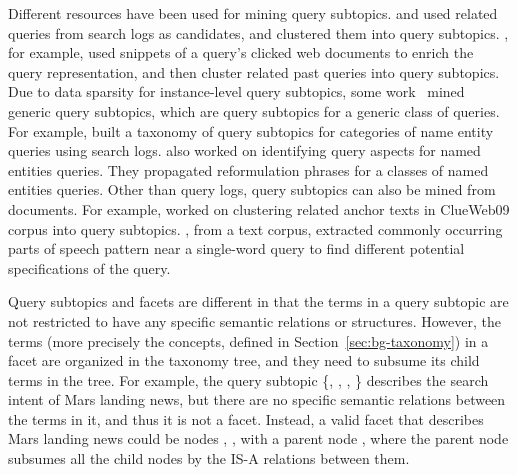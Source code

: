 Different resources have been used for mining query subtopics. \citet{wang2007learn} and \citet{hu2012mining} used related queries from search logs as candidates, and clustered them into query subtopics. \citet{wang2007learn}, for example, used snippets of a query's clicked web documents to enrich the query representation, and then cluster related past queries into query subtopics.
Due to data sparsity for instance-level query subtopics, some work~\cite{wang2009mining,xue2011topic,wu2011identifying,yin2010building} mined generic query subtopics, which are query subtopics for a generic class of queries. For example, \citet{yin2010building} built a taxonomy of query subtopics for categories of name entity queries using search logs. \citet{wu2011identifying} also worked on identifying query aspects for named entities queries. They propagated reformulation phrases for a classes of named entities queries. Other than query logs, query subtopics can also be mined from documents. For example, \citet{dang2011inferring} worked on clustering related anchor texts in ClueWeb09 corpus into query subtopics. \citet{allan2002using}, from a text corpus, extracted commonly occurring parts of speech pattern near a single-word query to find different potential specifications of the query.

Query subtopics and facets are different in that the terms in a query subtopic are not restricted to have any specific semantic relations or structures. However, the terms (more precisely the concepts, defined in Section~\ref{sec:bg-taxonomy}) in a facet are organized in the taxonomy tree, and they need to subsume its child terms in the tree. For example, the query subtopic \{, , , \} describes the search intent of Mars landing news, but there are no specific semantic relations between the terms in it, and thus it is not a facet. Instead, a valid facet that describes Mars landing news could be nodes , ,  with a parent node , where the parent node  subsumes all the child nodes by the IS-A relations between them. 

